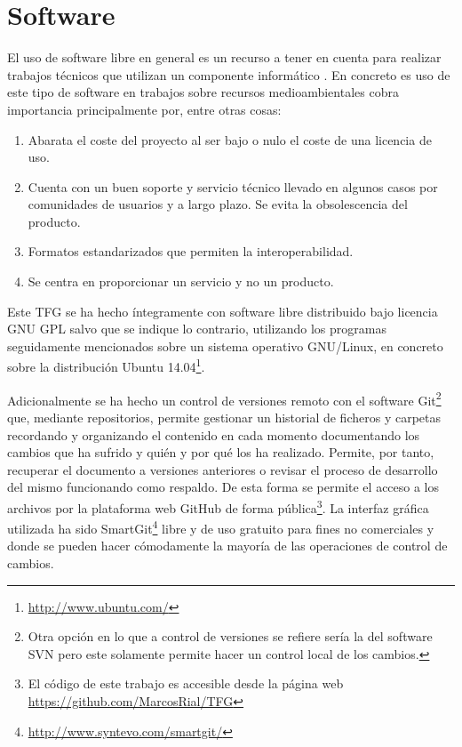 \section{Software} \label{sec:software}
El uso de software libre en general es un recurso a tener en cuenta para realizar trabajos técnicos que utilizan un componente informático \citep{MatellanOliveira2004} \citep{Mas2005software}. En concreto es uso de este tipo de software en trabajos sobre recursos medioambientales cobra importancia principalmente por, entre otras cosas:

\begin{enumerate}
	\item Abarata el coste del proyecto al ser bajo o nulo el coste de una licencia de uso.
	\item Cuenta con un buen soporte y servicio técnico llevado en algunos casos por comunidades de usuarios y a largo plazo. Se evita la obsolescencia del producto.
	\item Formatos estandarizados que permiten la interoperabilidad.
	\item Se centra en proporcionar un servicio y no un producto.
\end{enumerate}

Este \ac{TFG} se ha hecho íntegramente con software libre distribuido bajo licencia GNU GPL salvo que se indique lo contrario, utilizando los programas seguidamente mencionados sobre un sistema operativo GNU/Linux, en concreto sobre la distribución Ubuntu 14.04\footnote{\url{http://www.ubuntu.com/}}.%

Adicionalmente se ha hecho un control de versiones remoto con el software Git\footnote{Otra opción en lo que a control de versiones se refiere sería la del software \ac{SVN} \citep{Latex2011} pero este solamente permite hacer un control local de los cambios.} que, mediante repositorios, permite gestionar un historial de ficheros y carpetas recordando y organizando el contenido en cada momento documentando los cambios que ha sufrido y quién y por qué los ha realizado. Permite, por tanto, recuperar el documento a versiones anteriores o revisar el proceso de desarrollo del mismo funcionando como respaldo. De esta forma se permite el acceso a los archivos por la plataforma web GitHub de forma pública\footnote{El código de este trabajo es accesible desde la página web \url{https://github.com/MarcosRial/TFG}}. La interfaz gráfica utilizada ha sido SmartGit\footnote{\url{http://www.syntevo.com/smartgit/}} \citep{GmbH2015} libre y de uso gratuito para fines no comerciales y donde se pueden hacer cómodamente la mayoría de las operaciones de control de cambios.%

